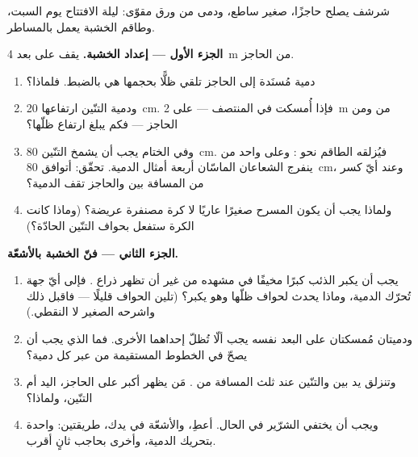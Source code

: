 \begin{problem}\label{pb:g6:light-propagation:1}
شرشف يصلح حاجزًا،  صغير ساطع، ودمى من ورق مقوّى: ليلة
الافتتاح يوم السبت، وطاقم الخشبة يعمل بالمساطر.

\medskip\noindent\textbf{الجزء الأول --- إعداد الخشبة.}
يقف  على بعد \qty{4}{m} من الحاجز.
\begin{enumerate}
  \item دمية مُسنَدة إلى الحاجز تلقي ظلًّا بحجمها هي بالضبط.
        فلماذا؟
  \item ودمية التنّين ارتفاعها \qty{20}{cm}. فإذا أُمسكت في
        المنتصف --- على \qty{2}{m} من  ومن الحاجز ---
        فكم يبلغ ارتفاع ظلّها؟
  \item وفي الختام يجب أن يشمخ التنّين \qty{80}{cm}. فيُزلقه
        الطاقم نحو : وعلى  واحد من  ينفرج
        الشعاعان الماسّان أربعة أمثال  الدمية. تحقّق: أتوافق
        \qty{80}{cm}، وعند أيّ كسر من المسافة بين 
        والحاجز تقف الدمية؟
  \item ولماذا يجب أن يكون  المسرح صغيرًا عاريًا لا كرة
        مصنفرة عريضة؟ (وماذا كانت الكرة ستفعل بحواف التنّين
        الحادّة؟)
\end{enumerate}

\medskip\noindent\textbf{الجزء الثاني --- فنّ الخشبة
بالأشعّة.}
\begin{enumerate}[resume]
  \item يجب أن يكبر الذئب كبرًا مخيفًا في مشهده من غير أن تظهر
        ذراع . فإلى أيّ جهة تُحرّك الدمية، وماذا يحدث
        لحواف ظلّها وهو يكبر؟ (تلين الحواف قليلًا --- فاقبل ذلك
        واشرحه   الصغير لا النقطي.)
  \item ودميتان مُمسكتان على البعد نفسه يجب ألّا تُظلّ إحداهما
        الأخرى. فما الذي يجب أن يصحّ في الخطوط المستقيمة من
         عبر كل دمية؟
  \item وتنزلق يد بين  والتنّين عند ثلث المسافة من
        .  مَن يظهر أكبر على الحاجز، اليد أم
        التنّين، ولماذا؟
  \item ويجب أن يختفي الشرّير في الحال. أعطِ، والأشعّة في يدك،
        طريقتين: واحدة بتحريك الدمية، وأخرى بحاجب ثانٍ
        أقرب.
\end{enumerate}


\end{problem}
